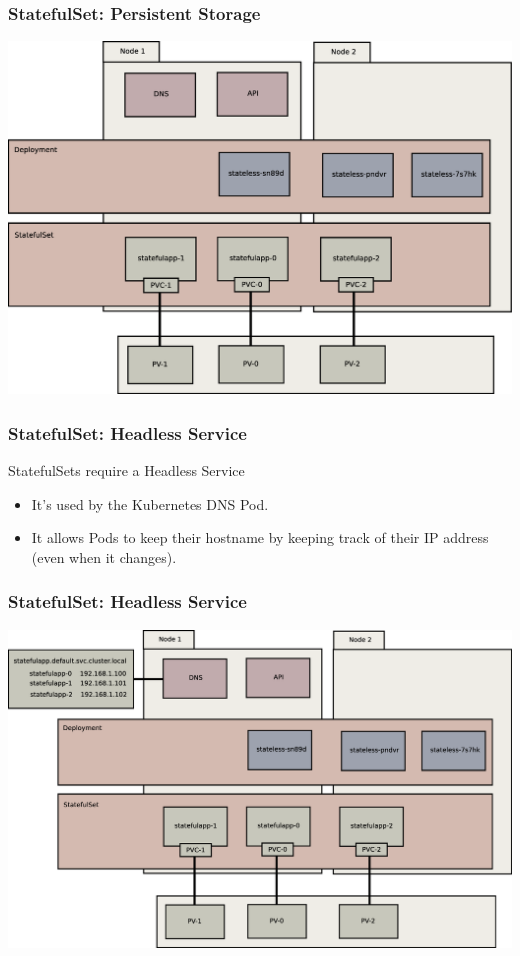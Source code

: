 \begin{frame}
    \frametitle{StatefulSet: Persistent Storage}
    \includegraphics[width=\textwidth,height=0.85\textheight,keepaspectratio]{graphics/06-persistence.eps}
\end{frame}

\begin{frame}
    \frametitle{StatefulSet: Headless Service}
    StatefulSets require a Headless Service
    \begin{itemize}
        \item It's used by the Kubernetes DNS Pod.\pause
        \item It allows Pods to keep their hostname by keeping track of their IP address (even when it changes).
    \end{itemize}
\end{frame}

\begin{frame}
    \frametitle{StatefulSet: Headless Service}
    \includegraphics[width=\textwidth,height=0.85\textheight,keepaspectratio]{graphics/07-persistentIdentity.eps}
\end{frame}

